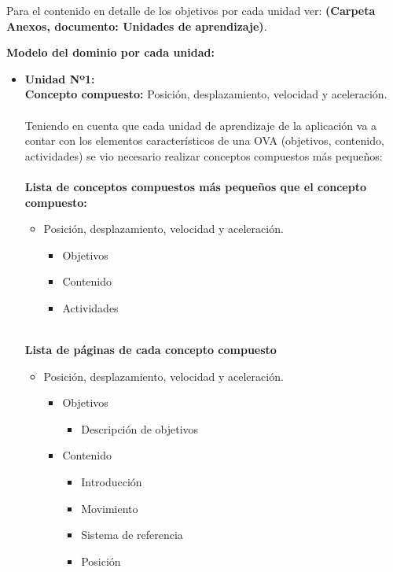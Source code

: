 Para el contenido en detalle de los objetivos por cada unidad ver: \textbf{(Carpeta Anexos, documento: Unidades de aprendizaje)}.

\textbf{Modelo del dominio por cada unidad: }\\
\begin{itemize}
    \item \textbf{Unidad Nº1: } \\
    \textbf{Concepto compuesto:}  Posición, desplazamiento, velocidad y aceleración.\\ \\
    Teniendo en cuenta que cada unidad de aprendizaje de la aplicación va a contar con los elementos característicos de una OVA (objetivos, contenido, actividades) se vio necesario realizar conceptos compuestos más pequeños:\\ \\
    \textbf{Lista de conceptos compuestos más pequeños que el concepto compuesto:}
    \begin{itemize}
        \item Posición, desplazamiento, velocidad y aceleración.
        \begin{itemize}
            \item Objetivos
            \item Contenido
            \item Actividades
        \end{itemize}
    \end{itemize}\ \\
    \textbf{Lista de páginas de cada concepto compuesto}
    \begin{itemize}
        \item Posición, desplazamiento, velocidad y aceleración.
        \begin{itemize}
            \item Objetivos
            \begin{itemize}
                \item Descripción de objetivos
            \end{itemize}
            \item Contenido
                \begin{itemize}
                    \item Introducción
                    \item Movimiento
                    \item Sistema de referencia
                    \item Posición

\end{itemize}
\end{itemize}
\end{itemize}
\end{itemize}
